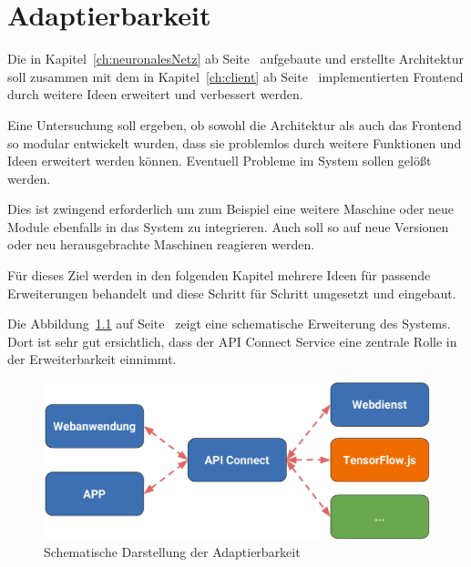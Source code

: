 \chapter{Adaptierbarkeit}
\label{ch:adaptierbarkeit}
Die in Kapitel~\ref{ch:neuronalesNetz} ab Seite~\pageref{ch:neuronalesNetz} aufgebaute und erstellte Architektur soll
zusammen mit dem in Kapitel~\ref{ch:client} ab Seite~\pageref{ch:client} implementierten Frontend durch weitere Ideen
erweitert und verbessert werden.

Eine Untersuchung soll ergeben, ob sowohl die Architektur als auch das Frontend so modular entwickelt wurden, dass sie 
problemlos durch weitere Funktionen und Ideen erweitert werden können. Eventuell Probleme im System sollen gelößt
werden.

Dies ist zwingend erforderlich um zum Beispiel eine weitere Maschine oder neue Module ebenfalls in das System zu
integrieren. Auch soll so auf neue Versionen oder neu herausgebrachte Maschinen reagieren werden.

Für dieses Ziel werden in den folgenden Kapitel mehrere Ideen für passende Erweiterungen behandelt und diese Schritt für 
Schritt umgesetzt und eingebaut.

Die Abbildung~\ref{fig:schematische_architektur_5} auf Seite~\pageref{fig:schematische_architektur_5} zeigt eine
schematische Erweiterung des Systems. Dort ist sehr gut ersichtlich, dass der API Connect Service eine zentrale Rolle
in der Erweiterbarkeit einnimmt.

\begin{figure}[h]
    \centering
    \includegraphics[width=\textwidth]{images/kapitel_5/architektur_schematisch.pdf}
    \caption{Schematische Darstellung der Adaptierbarkeit}
    \label{fig:schematische_architektur_5}
\end{figure}